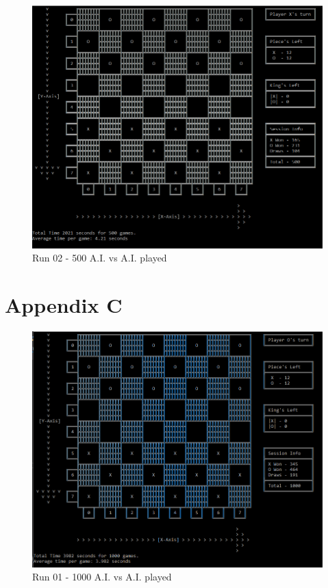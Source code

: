 \documentclass[10pt, a4paper]{article}
\begin{document}
\begin{figure}[H]
	\centering
	\includegraphics[scale=0.8]{RunTwo500}
	\caption{Run 02 - 500 A.I. vs A.I. played}
\end{figure}


\section{Appendix C}

\begin{figure}[H]
	\centering	
	\includegraphics[scale=0.8]{RunOne1000}
	\caption{Run 01 - 1000 A.I. vs A.I. played}		
\end{figure}
\end{document}
